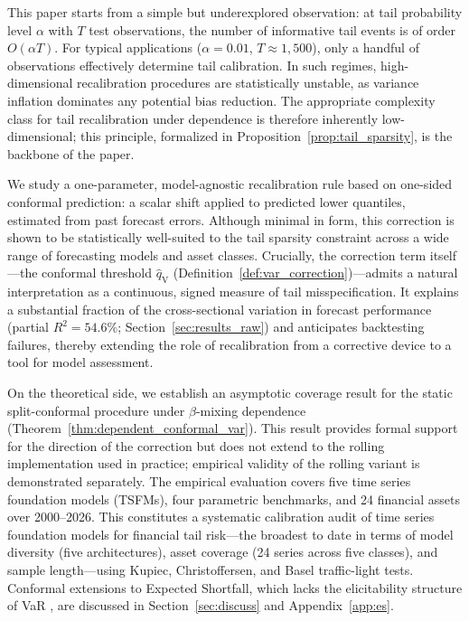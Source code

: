 \documentclass[preprint,11pt,authoryear]{elsarticle}
\newcommand{\1}{\boldsymbol{1}}
\newcommand{\qV}{\hat{q}_{\scriptscriptstyle\mathrm{V}}}
\begin{document}
	This paper starts from a simple but underexplored observation: at tail probability level $\alpha$ with $T$ test observations, the number of informative tail events is of order $O(\alpha T)$. For typical applications ($\alpha = 0.01$, $T \approx 1{,}500$), only a handful of observations effectively determine tail calibration. In such regimes, high-dimensional recalibration procedures are statistically unstable, as variance inflation dominates any potential bias reduction. The appropriate complexity class for tail recalibration under dependence is therefore inherently low-dimensional; this principle, formalized in Proposition~\ref{prop:tail_sparsity}, is the backbone of the paper.

	We study a one-parameter, model-agnostic recalibration rule based on one-sided conformal prediction: a scalar shift applied to predicted lower quantiles, estimated from past forecast errors. Although minimal in form, this correction is shown to be statistically well-suited to the tail sparsity constraint across a wide range of forecasting models and asset classes. Crucially, the correction term itself---the conformal threshold $\qV$ (Definition~\ref{def:var_correction})---admits a natural interpretation as a continuous, signed measure of tail misspecification. It explains a substantial fraction of the cross-sectional variation in forecast performance (partial $R^2 = 54.6\%$; Section~\ref{sec:results_raw}) and anticipates backtesting failures, thereby extending the role of recalibration from a corrective device to a tool for model assessment.

	On the theoretical side, we establish an asymptotic coverage result for the static split-conformal procedure under $\beta$-mixing dependence (Theorem~\ref{thm:dependent_conformal_var}). This result provides formal support for the direction of the correction but does not extend to the rolling implementation used in practice; empirical validity of the rolling variant is demonstrated separately. The empirical evaluation covers five time series foundation models (TSFMs), four parametric benchmarks, and 24 financial assets over 2000--2026. This constitutes a systematic calibration audit of time series foundation models for financial tail risk---the broadest to date in terms of model diversity (five architectures), asset coverage (24 series across five classes), and sample length---using Kupiec, Christoffersen, and Basel traffic-light tests. Conformal extensions to Expected Shortfall, which lacks the elicitability structure of VaR \citep{gneiting2011making}, are discussed in Section~\ref{sec:discuss} and Appendix~\ref{app:es}.
\end{document}

